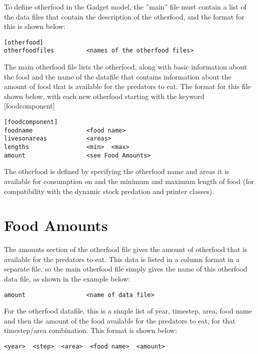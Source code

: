\documentclass [a4paper, 10pt]{book}
\begin{document}
\bigskip
To define otherfood in the Gadget model, the ''main'' file must contain a list of the data files that contain the description of the otherfood, and the format for this is shown below:

{\small\begin{verbatim}
[otherfood]
otherfoodfiles         <names of the otherfood files>
\end{verbatim}}

The main otherfood file lists the otherfood, along with basic information about the food and the name of the datafile that contains information about the amount of food that is available for the predators to eat.  The format for this file shown below, with each new otherfood starting with the keyword [foodcomponent]

{\small\begin{verbatim}
[foodcomponent]
foodname               <food name>
livesonareas           <areas>
lengths                <min>  <max>
amount                 <see Food Amounts>
\end{verbatim}}

The otherfood is defined by specifying the otherfood name and areas it is available for consumption on and the minimum and maximum length of food (for compatibility with the dynamic stock predation and printer classes).

\newpage
\section{Food Amounts}\label{sec:foodamounts}
The amounts section of the otherfood file gives the amount of otherfood that is available for the predators to eat.  This data is listed in a column format in a separate file, so the main otherfood file simply gives the name of this otherfood data file, as shown in the example below:

{\small\begin{verbatim}
amount                 <name of data file>
\end{verbatim}}

For the otherfood datafile, this is a simple list of year, timestep, area, food name and then the amount of the food available for the predators to eat, for that timestep/area combination.  This format is shown below:

{\small\begin{verbatim}
<year>  <step>  <area>  <food name>  <amount>
\end{verbatim}}
\end{document}
